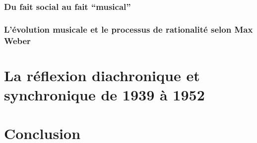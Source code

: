 \documentclass[%
  12pt,oneside,output=paper%
  ,output=paper%
]{yathesis}
\begin{document}








\section{Du fait social au fait \enquote{musical}}






\section{L'évolution musicale et le processus de rationalité selon Max Weber}









\part{La réflexion diachronique et synchronique de 1939 à 1952}



\part{Conclusion}

\backmatter

\printbibliography



\makebackcover
\end{document}
